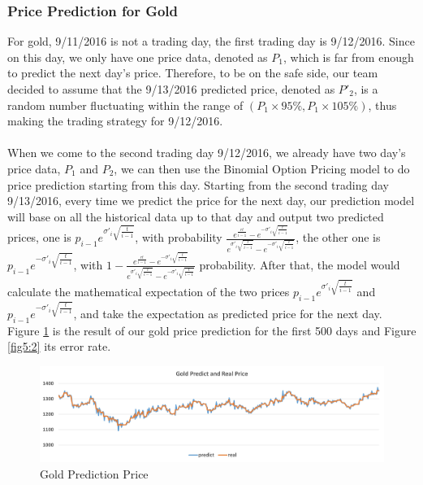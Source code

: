 \documentclass[12pt]{article}
\begin{document}
\subsubsection{Price Prediction for Gold}
For gold, 9/11/2016 is not a trading day, the first trading day is 9/12/2016. Since on this day, we only have one price data, denoted as $P_1$, which is far from enough to predict the next day's price. Therefore, to be on the safe side, our team decided to assume that the 9/13/2016 predicted price, denoted as $P'_2$, is a random number fluctuating within the range of $(P_1\times95\%, P_1\times105\%)$, thus making the trading strategy for 9/12/2016. 
\paragraph{}
When we come to the second trading day 9/12/2016, we already have two day's price data, $P_1$ and $P_2$, we can then use the Binomial Option Pricing model to do price prediction starting from this day.
Starting from the second trading day 9/13/2016, every time we predict the price for the next day, our prediction model will base on all the historical data up to that day and output two predicted prices, one is $p_{i-1}e^{\sigma'_i\sqrt{\frac{t}{i-1}}}$, with probability $\frac{e^{\frac{rt}{i-1}}-e^{-\sigma'_i\sqrt{\frac{t}{i-1}}}}{e^{\sigma'_i\sqrt{\frac{t}{i-1}}}-e^{-\sigma'_i\sqrt{\frac{t}{i-1}}}}$, the other one is $p_{i-1}e^{-\sigma'_i\sqrt{\frac{t}{i-1}}}$, with $1-\frac{e^{\frac{rt}{i-1}}-e^{-\sigma'_i\sqrt{\frac{t}{i-1}}}}{e^{\sigma'_i\sqrt{\frac{t}{i-1}}}-e^{-\sigma'_i\sqrt{\frac{t}{i-1}}}}$ probability. After that, the model would calculate the mathematical expectation of the two prices $p_{i-1}e^{\sigma'_i\sqrt{\frac{t}{i-1}}}$ and $p_{i-1}e^{-\sigma'_i\sqrt{\frac{t}{i-1}}}$, and take the expectation as predicted price for the next day. Figure \ref{fig4:2} is the result of our gold price prediction for the first 500 days and Figure \ref{fig5:2} its error rate.
\begin{figure}[htp]
    \centering
    \includegraphics[width=.8\linewidth]{figures/fig5}  
    \caption{Gold Prediction Price}
    \label{fig4:2}
\end{figure}
\end{document}
